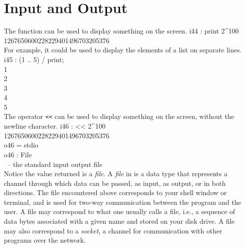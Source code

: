 
\section{Input and Output}

The function  can be used to display something on the screen.
\beginOutput
i44 : print 2^100\\
1267650600228229401496703205376\\
\endOutput
For example, it could be used to display the elements of a list on separate
lines.
\beginOutput
i45 : (1 .. 5) / print;\\
1\\
2\\
3\\
4\\
5\\
\endOutput
The operator {\tt <<} can be used to display something on the
screen, without the newline character.
\beginOutput
i46 : << 2^100\\
1267650600228229401496703205376\\
o46 = stdio\\
\emptyLine
o46 : File\\
\emptyLine
\  --  the standard input output file\\
\endOutput
Notice the value returned is a {\em file}.  A {\em file} in \Mtwo is a data type that
represents a channel through which data can be passed, as input, as
output, or in both directions.  The file  encountered above
corresponds to your shell window or terminal, and is used for two-way
communication between the program and the user.  A file may correspond
to what one usually calls a file, i.e., a sequence of data bytes associated
with a given name and stored on
your disk drive.  A file may also correspond to a {\em socket}, a
channel for communication with other programs over the network.

